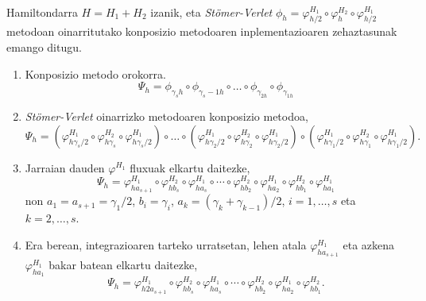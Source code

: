 \paragraph*{}Hamiltondarra $H=H_1+H_2$ izanik, eta \emph{Stömer-Verlet}  $\phi_h=\varphi_{h/2}^{H_1} \circ \varphi_{h}^{H_2} \circ \varphi_{h/2}^{H_1}$ metodoan oinarritutako konposizio metodoaren inplementazioaren zehaztasunak emango ditugu.

\begin{enumerate}
\item Konposizio metodo orokorra.
\begin{equation*}
\Psi_h =\phi_{\gamma_s h} \circ \phi_{\gamma_s-1 h} \circ \dots \circ \phi_{\gamma_{2 h}} \circ \phi_{\gamma_{1 h}}
\end{equation*}

\item \emph{Stömer-Verlet} oinarrizko metodoaren konposizio metodoa,
\begin{equation*}
\Psi_h =(\varphi_{h \gamma_s/2}^{H_1} \circ \varphi_{h \gamma_s}^{H_2} \circ \varphi_{h \gamma_s/2}^{H_1}) \circ \dots 
       \circ
       (\varphi_{h \gamma_2/2}^{H_1} \circ \varphi_{h \gamma_2}^{H_2} \circ \varphi_{h \gamma_2/2}^{H_1}) 
       \circ
       (\varphi_{h \gamma_1/2}^{H_1} \circ \varphi_{h \gamma_1}^{H_2} \circ \varphi_{h \gamma_1/2}^{H_1}).  
\end{equation*}

\item Jarraian dauden $\varphi^{H_1}$ fluxuak elkartu daitezke,
\begin{equation*}
\Psi_h=\varphi_{h a_{s+1}}^{H_1} \circ \varphi_{h b_s}^{H_2} \circ \varphi_{h a_s}^{H_1} \circ \cdots 
       \circ
       \varphi_{h b_2}^{H_2} 
       \circ
       \varphi_{h a_2}^{H_1} \circ \varphi_{h b_1}^{H_2} \circ \varphi_{h a_1}^{H_1}  
\end{equation*}
non $a_1=a_{s+1}=\gamma_1/2$, $b_i=\gamma_i$, $a_k=(\gamma_k+\gamma_{k-1})/2$, $i=1,\dots,s$ eta $k=2,\dots,s$.

\item Era berean, integrazioaren tarteko urratsetan, lehen atala $\varphi_{h a_{s+1}}^{H_1}$ eta azkena $\varphi_{h a_1}^{H_1}$ bakar batean elkartu daitezke,
\begin{equation*}
\Psi_h=\varphi_{h 2 a_{s+1}}^{H_1} \circ \varphi_{h b_s}^{H_2} \circ \varphi_{h a_s}^{H_1} \circ \cdots 
\circ \varphi_{h b_2}^{H_2} 
\circ
\varphi_{h a_2}^{H_1} \circ \varphi_{h b_1}^{H_2}.
\end{equation*}

\end{enumerate}


